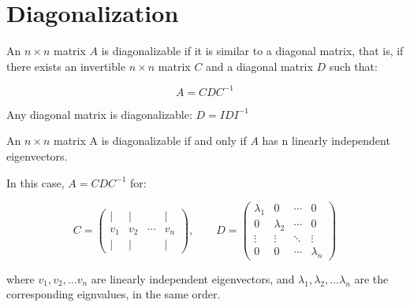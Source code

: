 % 


\section{Diagonalization}

\begin{definition}[diagonalization]
   An $n  \times n$ matrix $A$ is diagonalizable if it is similar to a diagonal matrix, that is, if there exists an invertible $n \times n$ matrix $C$ and a diagonal matrix $D$ such that:

   $$A = C D C^{-1}$$
\end{definition}

\begin{eg}
    Any diagonal matrix is diagonalizable:  $D = IDI^{-1}$    
\end{eg}

\begin{theorem}
    An $n \times n$ matrix A is diagonalizable if and only if $A$ has n linearly independent eigenvectors.

    In this case, $A = CDC^{-1}$ for:

    \[
    C = \begin{pmatrix}
        | & | &  & | \\
        v_1 & v_2 & \cdots & v_n \\
        | & | &  & | 
        \end{pmatrix},
        \qquad
    D = \begin{pmatrix}
        \lambda_1 & 0 & \cdots & 0  \\  
        0 & \lambda_2 & \cdots & 0 \\
        \vdots & \vdots & \ddots & \vdots \\
        0 & 0 & \cdots & \lambda_n 
    \end{pmatrix} 
    \]

    where $v_1, v_2, \dots v_n$  are linearly independent eigenvectors, and $\lambda_1, \lambda_2, \dots \lambda_n$ are the corresponding eignvalues, in the same order.
\end{theorem}

